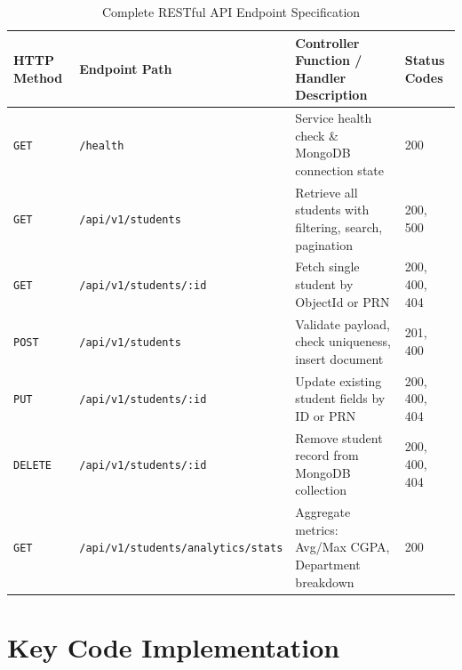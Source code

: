\documentclass[11pt,a4paper]{article}
\begin{document}
\begin{table}[h!]
\centering
\small
\begin{tabularx}{\textwidth}{llp{7.5cm}l}
\toprule
\textbf{HTTP Method} & \textbf{Endpoint Path} & \textbf{Controller Function / Handler Description} & \textbf{Status Codes} \\
\midrule
\texttt{GET} & \texttt{/health} & Service health check \& MongoDB connection state & 200 \\
\texttt{GET} & \texttt{/api/v1/students} & Retrieve all students with filtering, search, pagination & 200, 500 \\
\texttt{GET} & \texttt{/api/v1/students/:id} & Fetch single student by ObjectId or PRN & 200, 400, 404 \\
\texttt{POST} & \texttt{/api/v1/students} & Validate payload, check uniqueness, insert document & 201, 400 \\
\texttt{PUT} & \texttt{/api/v1/students/:id} & Update existing student fields by ID or PRN & 200, 400, 404 \\
\texttt{DELETE} & \texttt{/api/v1/students/:id} & Remove student record from MongoDB collection & 200, 400, 404 \\
\texttt{GET} & \texttt{/api/v1/students/analytics/stats} & Aggregate metrics: Avg/Max CGPA, Department breakdown & 200 \\
\bottomrule
\end{tabularx}
\caption{Complete RESTful API Endpoint Specification}
\end{table}

\section{Key Code Implementation}
\end{document}

